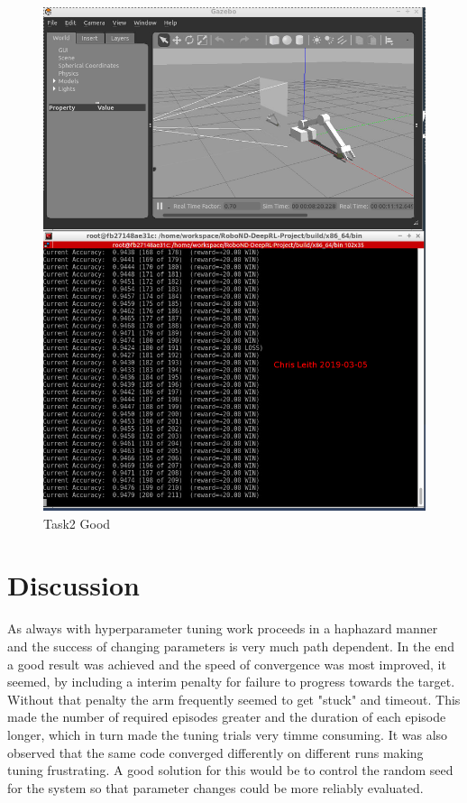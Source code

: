 \documentclass[10pt]{article}
\begin{document}
\begin{figure}[p]
      \centering
      \includegraphics[width=\linewidth]{Assets/Task2_94at200_Learn0p05_2019-03-05_12-04-49.png}
      \caption{Task2 Good}
      \label{fig:Task2Good}
\end{figure}

\section{Discussion}
As always with hyperparameter tuning work proceeds in a haphazard manner and the success of changing parameters is very much path dependent. In the end a good result was achieved and the speed of convergence was most improved, it seemed, by including a interim penalty for failure to progress towards the
target. Without that penalty the arm frequently seemed to get "stuck" and timeout. This made the number of required episodes greater and the duration of each episode longer, which in turn made the tuning trials very timme consuming.
It was also observed that the same code converged differently on different runs making tuning frustrating. A good solution for this would be to control the random seed for the system so that parameter changes could be more reliably evaluated.    
\end{document}
